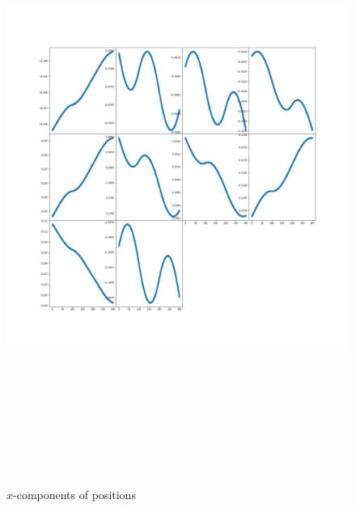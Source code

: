 \documentclass[12pt]{article}
\begin{document}
	\begin{figure}[H]
		\includegraphics[width=\linewidth, height=20cm]{subpsx3Bz.png} \caption{$x$-components of positions} \label{subpsx3Bz}
	\end{figure}
\end{document}
